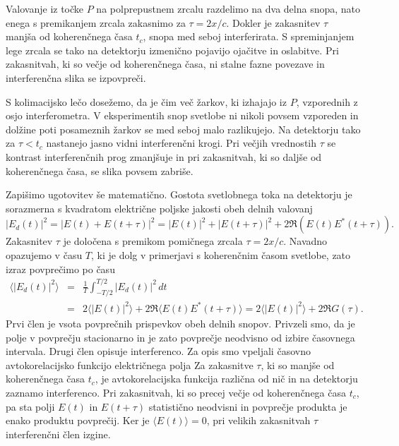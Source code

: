 Valovanje iz točke $P$ na polprepustnem zrcalu razdelimo na dva delna snopa, 
nato enega s premikanjem zrcala zakasnimo za $\tau=2x/c$. Dokler je zakasnitev
$\tau$ manjša od koherenčnega časa $t_{c}$, snopa med seboj interferirata.
S spreminjanjem lege zrcala se tako na detektorju izmenično pojavijo ojačitve in 
oslabitve. Pri zakasnitvah, ki so večje od koherenčnega časa, ni stalne fazne 
povezave in interferenčna slika se izpovpreči. 

\begin{remark}
S kolimacijsko lečo dosežemo, da je čim več žarkov, ki izhajajo iz
$P$, vzporednih z osjo interferometra. V eksperimentih snop svetlobe 
ni nikoli povsem vzporeden in dolžine poti posameznih žarkov se med
seboj malo razlikujejo. Na detektorju tako za $\tau < t_c$ nastanejo jasno 
vidni interferenčni krogi. Pri večjih vrednostih $\tau$  se kontrast interferenčnih
prog zmanjšuje in pri zakasnitvah, ki so daljše od koherenčnega časa, se 
slika povsem zabriše. 
\end{remark}

Zapišimo ugotovitev še matematično.
Gostota svetlobnega toka na detektorju je sorazmerna s kvadratom električne
poljske jakosti obeh delnih valovanj
\begin{equation}
|E_{d}(t)|^{2}=|E(t)+E(t+\tau)|^{2}=|E(t)|^{2}+|E(t+\tau)|^{2}+2\Re \left(E(t)E^{*}(t+\tau)\right).
\label{eq:Michelson-intenziteta}
\end{equation}
Zakasnitev $\tau$ je določena s premikom pomičnega zrcala $\tau=2x/c$.
Navadno opazujemo v času $T$, ki je dolg v primerjavi s koherenčnim
časom svetlobe, zato izraz povprečimo po času
\begin{eqnarray}
\langle|E_{d}(t)|^{2}\rangle & = & \frac{1}{T}\int_{-T/2}^{T/2}|E{}_{d}(t)|^{2}\, dt\nonumber \\
 & = & 2\langle|E(t)|^{2}\rangle+2\Re\langle E(t)E^{*}(t+\tau)\rangle = 2\langle|E(t)|^{2}\rangle+2\Re G(\tau).
\end{eqnarray}
Prvi člen je vsota povprečnih prispevkov obeh delnih snopov. Privzeli
smo, da je polje v povprečju stacionarno in je zato povprečje neodvisno
od izbire časovnega intervala. Drugi člen opisuje interferenco. 
Za opis smo vpeljali
časovno avtokorelacijsko funkcijo
električnega polja 
Za zakasnitve $\tau$, ki so manjše od koherenčnega časa $t_c$, je avtokorelacijska
funkcija različna od nič in na
detektorju zaznamo interferenco. Pri zakasnitvah, ki so precej
večje od koherenčnega časa $t_{c}$, pa sta polji $E(t)$ in $E(t+\tau)$
statistično neodvisni in povprečje produkta je enako produktu povprečij.
Ker je $\langle E(t)\rangle=0$, pri velikih zakasnitvah $\tau$ interferenčni
člen izgine.

